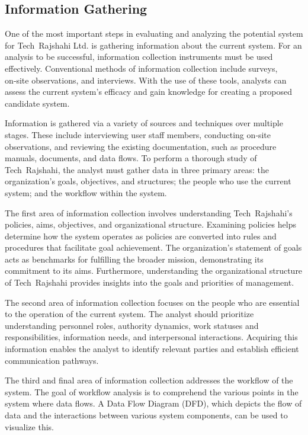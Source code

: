 \documentclass[12pt,a4paper]{article}
\begin{document}
\subsection{Information Gathering}
One of the most important steps in evaluating and analyzing the potential system for Tech Rajshahi Ltd. is gathering information about the current system.  For an analysis to be successful, information collection instruments must be used effectively.  Conventional methods of information collection include surveys, on‑site observations, and interviews.  With the use of these tools, analysts can assess the current system’s efficacy and gain knowledge for creating a proposed candidate system.

Information is gathered via a variety of sources and techniques over multiple stages.  These include interviewing user staff members, conducting on‑site observations, and reviewing the existing documentation, such as procedure manuals, documents, and data flows.  To perform a thorough study of Tech Rajshahi, the analyst must gather data in three primary areas: the organization’s goals, objectives, and structures; the people who use the current system; and the workflow within the system.

The first area of information collection involves understanding Tech Rajshahi’s policies, aims, objectives, and organizational structure.  Examining policies helps determine how the system operates as policies are converted into rules and procedures that facilitate goal achievement.  The organization’s statement of goals acts as benchmarks for fulfilling the broader mission, demonstrating its commitment to its aims.  Furthermore, understanding the organizational structure of Tech Rajshahi provides insights into the goals and priorities of management.

The second area of information collection focuses on the people who are essential to the operation of the current system.  The analyst should prioritize understanding personnel roles, authority dynamics, work statuses and responsibilities, information needs, and interpersonal interactions.  Acquiring this information enables the analyst to identify relevant parties and establish efficient communication pathways.

The third and final area of information collection addresses the workflow of the system.  The goal of workflow analysis is to comprehend the various points in the system where data flows.  A Data Flow Diagram (DFD), which depicts the flow of data and the interactions between various system components, can be used to visualize this. 
\end{document}
